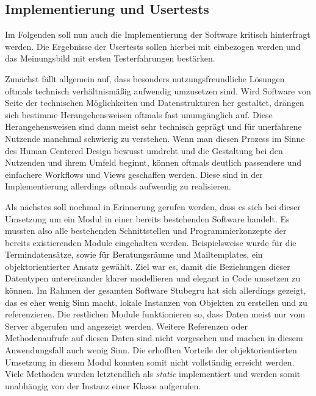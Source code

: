 \subsection*{Implementierung und Usertests}

Im Folgenden soll nun auch die Implementierung der Software kritisch
hinterfragt werden. Die Ergebnisse der Usertests sollen hierbei mit einbezogen
werden und das Meinungsbild mit ersten Testerfahrungen bestärken.

Zunächst fällt allgemein auf, dass besonders nutzungsfreundliche Lösungen
oftmals technisch verhältnismäßig aufwendig umzusetzen sind. Wird Software von
Seite der technischen Möglichkeiten und Datenstrukturen her gestaltet, drängen
sich bestimme Herangehensweisen oftmals fast unumgänglich auf. Diese
Herangehensweisen sind dann meist sehr technisch geprägt und für unerfahrene
Nutzende manchmal schwierig zu verstehen. Wenn man diesen Prozess im Sinne des
Human Centered Design bewusst umdreht und die Gestaltung bei den Nutzenden und
ihrem Umfeld beginnt, können oftmals deutlich passendere und einfachere
Workflows und Views geschaffen werden. Diese sind in der Implementierung
allerdings oftmals aufwendig zu realisieren.

Als nächstes soll nochmal in Erinnerung gerufen werden, dass es sich bei dieser
Umsetzung um ein Modul in einer bereits bestehenden Software handelt. Es
mussten also alle bestehenden Schnittstellen und Programmierkonzepte der
bereits existierenden Module eingehalten werden. Beispielsweise wurde für die
Termindatensätze, sowie für Beratungsräume und Mailtemplates, ein
objektorientierter Ansatz gewählt. Ziel war es, damit die Beziehungen dieser
Datentypen untereinander klarer modellieren und elegant in Code umsetzen zu
können. Im Rahmen der gesamten Software Stubegru hat sich allerdings gezeigt,
das es eher wenig Sinn macht, lokale Instanzen von Objekten zu erstellen und zu
referenzieren. Die restlichen Module funktionieren so, dass Daten meist nur vom
Server abgerufen und angezeigt werden. Weitere Referenzen oder Methodenaufrufe
auf diesen Daten sind nicht vorgesehen und machen in diesem Anwendungsfall auch
wenig Sinn. Die erhofften Vorteile der objektorientierten Umsetzung in diesem
Modul konnten somit nicht vollständig erreicht werden. Viele Methoden wurden
letztendlich als \textit{static} implementiert und werden somit unabhängig von
der Instanz einer Klasse aufgerufen.

